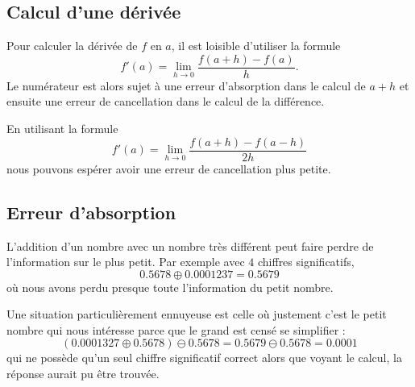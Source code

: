 \subsection{Calcul d'une dérivée}

Pour calculer la dérivée de \( f\) en \( a\), il est loisible d'utiliser la formule
\begin{equation}
    f'(a)=\lim_{h\to 0} \frac{ f(a+h)-f(a) }{ h }.
\end{equation}
Le numérateur est alors sujet à une erreur d'absorption dans le calcul de \( a+h\) et ensuite une erreur de cancellation dans le calcul de la différence.

En utilisant la formule
\begin{equation}
    f'(a)=\lim_{h\to 0} \frac{ f(a+h)-f(a-h) }{ 2h }
\end{equation}
nous pouvons espérer avoir une erreur de cancellation plus petite.


\subsection{Erreur d'absorption}

L'addition d'un nombre avec un nombre très différent peut faire perdre de l'information sur le plus petit. Par exemple avec \( 4\) chiffres significatifs,
\begin{equation}
    0.5678\oplus 0.0001237=0.5679
\end{equation}
où nous avons perdu presque toute l'information du petit nombre.

Une situation particulièrement ennuyeuse est celle où justement c'est le petit nombre qui nous intéresse parce que le grand est censé se simplifier :
\begin{equation}
    (0.0001327\oplus 0.5678)\ominus 0.5678=0.5679\ominus 0.5678=0.0001
\end{equation}
qui ne possède qu'un seul chiffre significatif correct alors que voyant le calcul, la réponse aurait pu être trouvée.

